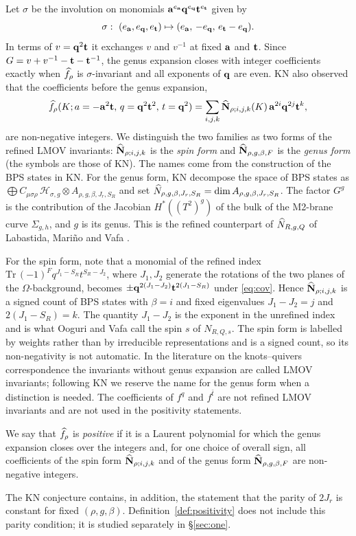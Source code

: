 Let $\sigma$ be the involution on monomials $\mathbf{a}^{e_{\mathbf{a}}}\mathbf{q}^{e_{\mathbf{q}}}\mathbf{t}^{e_{\mathbf{t}}}$ given by
\begin{equation}\label{eq:sigma}
\sigma:\ (e_\ba,e_\bq,e_\bt)\mapsto(e_\ba,\,-e_\bq,\,e_\bt-e_\bq).
\end{equation}
In terms of $v=\mathbf{q}^2\mathbf{t}$ it exchanges $v$ and $v^{-1}$ at fixed $\mathbf{a}$ and $\mathbf{t}$. Since $G=v+v^{-1}-\mathbf{t}-\mathbf{t}^{-1}$,
the genus expansion closes with integer coefficients exactly when $\widehat{f}_\rho$ is $\sigma$-invariant and all exponents of $\mathbf{q}$ are even.
KN also observed that the coefficients before the genus expansion,
\[
\widehat{f}_\rho(K;a=-\mathbf{a}^2\mathbf{t},\,q=\mathbf{q}^2\mathbf{t}^2,\,t=\mathbf{q}^2)=\sum_{i,j,k}\widehat{\mathbf{N}}_{\rho;i,j,k}(K)\,\mathbf{a}^{2i}\mathbf{q}^{2j}\mathbf{t}^{k},
\]
are non-negative integers.
We distinguish the two families as two forms of the refined LMOV invariants:
$\widehat{\mathbf{N}}_{\rho;i,j,k}$ is the \emph{spin form} and $\widehat{\mathbf{N}}_{\rho,g,\beta,F}$ is the \emph{genus form} (the symbols are those of KN).
The names come from the construction of the BPS states in KN.
For the genus form, KN decompose the space of BPS states as $\bigoplus C_{\mu\sigma\rho}\,\mathcal{H}_{\sigma,g}\otimes A_{\rho,g,\beta,J_r,S_R}$ and set $\widehat{N}_{\rho,g,\beta,J_r,S_R}=\dim A_{\rho,g,\beta,J_r,S_R}$.
The factor $G^g$ is the contribution of the Jacobian $H^*((T^2)^g)$ of the bulk of the M2-brane curve $\Sigma_{g,h}$, and $g$ is its genus.
This is the refined counterpart of $\widehat{N}_{R,g,Q}$ of Labastida, Mari\~no and Vafa \cite{Labastida01}.

For the spin form, note that a monomial of the refined index $\mathrm{Tr}\,(-1)^Fq^{J_1-S_R}t^{S_R-J_2}$, where $J_1,J_2$ generate the rotations of the two planes of the $\Omega$-background,
becomes $\pm\mathbf{q}^{2(J_1-J_2)}\mathbf{t}^{2(J_1-S_R)}$ under \eqref{eq:cov}.
Hence $\widehat{\mathbf{N}}_{\rho;i,j,k}$ is a signed count of BPS states with $\beta=i$ and fixed eigenvalues $J_1-J_2=j$ and $2(J_1-S_R)=k$.
The quantity $J_1-J_2$ is the exponent in the unrefined index and is what Ooguri and Vafa \cite{Ooguri99} call the spin $s$ of $N_{R,Q,s}$.
The spin form is labelled by weights rather than by irreducible representations and is a signed count, so its non-negativity is not automatic.
In the literature on the knots--quivers correspondence \cite{Ekholm18} the invariants without genus expansion are called LMOV invariants; following KN we reserve the name for the genus form when a distinction is needed.
The coefficients of $f^q$ and $f^{\bar t}$ are not refined LMOV invariants and are not used in the positivity statements.

\begin{definition}[Positivity]\label{def:positivity}
We say that $\widehat{f}_\rho$ is \emph{positive} if it is a Laurent polynomial for which the genus expansion closes over the integers and,
for one choice of overall sign, all coefficients of the spin form $\widehat{\mathbf{N}}_{\rho;i,j,k}$ and of the genus form $\widehat{\mathbf{N}}_{\rho,g,\beta,F}$ are non-negative integers.
\end{definition}
The KN conjecture contains, in addition, the statement that the parity of $2J_r$ is constant for fixed $(\rho,g,\beta)$.
Definition~\ref{def:positivity} does not include this parity condition; it is studied separately in \S\ref{sec:one}.

